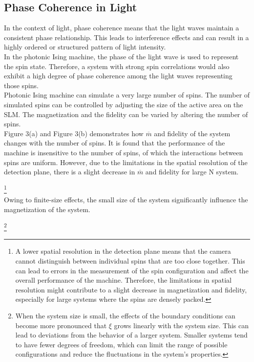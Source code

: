 \subsection{Phase Coherence in Light}
In the context of light, phase coherence means that the light waves maintain a consistent phase relationship. This leads to interference effects and can result in a highly ordered or structured pattern of light intensity.\\ 

In the photonic Ising machine, the phase of the light wave is used to represent the spin state. Therefore, a system with strong spin correlations would also exhibit a high degree of phase coherence among the light waves representing those spins.\\

Photonic Ising machine can simulate a very large number of spins. The number of simulated spins can be controlled by adjusting the size of the active area on the SLM. The magnetization and the fidelity can be varied by altering the number of spins. \\

Figure 3(a) and Figure 3(b) demonstrates how $\overline{m}$ and fidelity of the system changes with the number of spins. It is found that the performance of the machine is insensitive to the number of spins, of which the interactions between spins are uniform. However, due to the limitations in the spatial resolution of the detection plane, there is a slight decrease in $\overline{m}$ and fidelity for large N system. 

\footnote{A lower spatial resolution in the detection plane means that the camera cannot distinguish between individual spins that are too close together. This can lead to errors in the measurement of the spin configuration and affect the overall performance of the machine. Therefore, the limitations in spatial resolution might contribute to a slight decrease in magnetization and fidelity, especially for large systems where the spins are densely packed.} \\

Owing to finite-size effects, the small size of the system significantly influence the magnetization of the system. 

\footnote{When the system size is small, the effects of the boundary conditions can become more pronounced that $\xi$ grows linearly with the system size. This can lead to deviations from the behavior of a larger system. Smaller systems tend to have fewer degrees of freedom, which can limit the range of possible configurations and reduce the fluctuations in the system's properties.} \\

